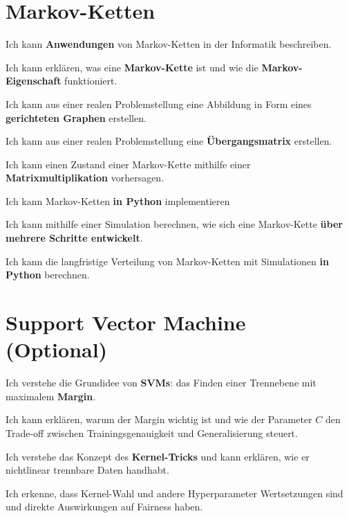 \section{Markov-Ketten}
\begin{todolist}
    \item Ich kann \textbf{Anwendungen} von Markov-Ketten in der Informatik beschreiben.
    \item Ich kann erklären, was eine \textbf{Markov-Kette} ist und wie die \textbf{Markov-Eigenschaft} funktioniert.
    \item Ich kann aus einer realen Problemstellung eine Abbildung in Form eines \textbf{gerichteten Graphen} erstellen.
    \item Ich kann aus einer realen Problemstellung eine \textbf{Übergangsmatrix} erstellen.
    \item Ich kann einen Zustand einer Markov-Kette mithilfe einer \textbf{Matrixmultiplikation} vorhersagen.

    \item Ich kann Markov-Ketten \textbf{in Python} implementieren
    \item Ich kann mithilfe einer Simulation berechnen, wie sich eine Markov-Kette \textbf{über mehrere Schritte entwickelt}.
    \item Ich kann die langfristige Verteilung von Markov-Ketten mit Simulationen \textbf{in Python} berechnen.
\end{todolist}


\section{Support Vector Machine (Optional)}
\begin{todolist}
    \item Ich verstehe die Grundidee von \textbf{SVMs}: das Finden einer Trennebene mit maximalem \textbf{Margin}.
    \item Ich kann erklären, warum der Margin wichtig ist und wie der Parameter $C$ den Trade-off zwischen Trainingsgenauigkeit und Generalisierung steuert.
    \item Ich verstehe das Konzept des \textbf{Kernel-Tricks} und kann erklären, wie er nichtlinear trennbare Daten handhabt.
    \item Ich erkenne, dass Kernel-Wahl und andere Hyperparameter Wertsetzungen sind und direkte Auswirkungen auf Fairness haben.
\end{todolist}

